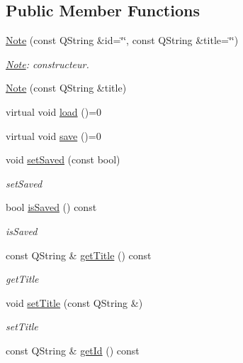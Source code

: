 \subsection*{Public Member Functions}
\begin{DoxyCompactItemize}
\item 
\hyperlink{class_notes_module_1_1_note_acffe7f2d5efa93a522b1d08c745a5acb}{Note} (const Q\-String \&id=\char`\"{}\char`\"{}, const Q\-String \&title=\char`\"{}\char`\"{})
\begin{DoxyCompactList}\small\item\em \hyperlink{class_notes_module_1_1_note}{Note}\-: constructeur. \end{DoxyCompactList}\item 
\hyperlink{class_notes_module_1_1_note_aacf392675cebd9080672a543755e360b}{Note} (const Q\-String \&title)
\item 
virtual void \hyperlink{class_notes_module_1_1_note_ad1b766b75cc0c201cab42ca0ee175efb}{load} ()=0
\item 
virtual void \hyperlink{class_notes_module_1_1_note_aafaae92e7b543c5936dccc9b3f05bac0}{save} ()=0
\item 
void \hyperlink{class_notes_module_1_1_note_aa80aa1f6d1e31d7aa9f9ecbf1dafd9e8}{set\-Saved} (const bool)
\begin{DoxyCompactList}\small\item\em set\-Saved \end{DoxyCompactList}\item 
bool \hyperlink{class_notes_module_1_1_note_a467459e84f8fc17e1c8a72cfbf348a0e}{is\-Saved} () const 
\begin{DoxyCompactList}\small\item\em is\-Saved \end{DoxyCompactList}\item 
const Q\-String \& \hyperlink{class_notes_module_1_1_note_ac5891af072f8e8d990909a65c0702244}{get\-Title} () const 
\begin{DoxyCompactList}\small\item\em get\-Title \end{DoxyCompactList}\item 
void \hyperlink{class_notes_module_1_1_note_a5df579a3f08ddffb0dc11f67c32ec87c}{set\-Title} (const Q\-String \&)
\begin{DoxyCompactList}\small\item\em set\-Title \end{DoxyCompactList}\item 
const Q\-String \& \hyperlink{class_notes_module_1_1_note_a0e1f8e88f298968b5a1be8483516bbc1}{get\-Id} () const 

\end{DoxyCompactItemize}
